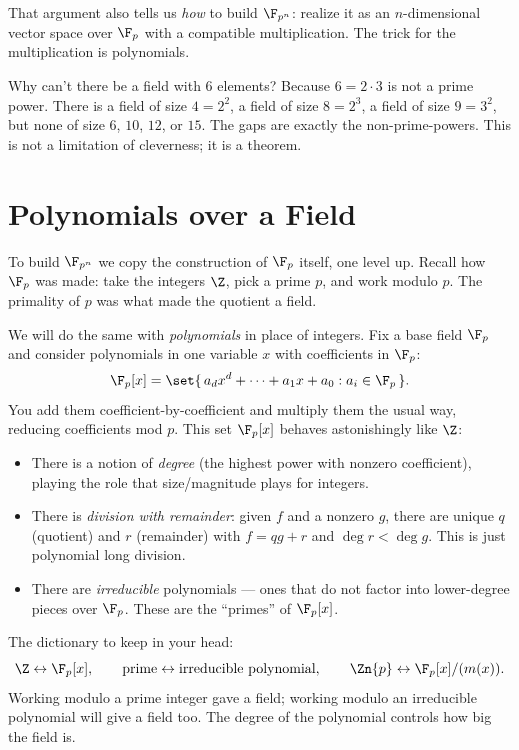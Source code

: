 That argument also tells us \emph{how} to build $\F_{p^n}$: realize it as an
$n$-dimensional vector space over $\F_p$ with a compatible multiplication.
The trick for the multiplication is polynomials.

\begin{intuitionbox}
Why can't there be a field with $6$ elements? Because $6 = 2\cdot 3$ is not a
prime power. There is a field of size $4=2^2$, a field of size $8=2^3$, a
field of size $9 = 3^2$, but none of size $6$, $10$, $12$, or $15$. The gaps
are exactly the non-prime-powers. This is not a limitation of cleverness; it
is a theorem.
\end{intuitionbox}

\section{Polynomials over a Field}
\label{ch06:polynomials}

To build $\F_{p^n}$ we copy the construction of $\F_p$ itself, one level up.
Recall how $\F_p$ was made: take the integers $\Z$, pick a prime $p$, and
work modulo $p$. The primality of $p$ was what made the quotient a field.

We will do the same with \emph{polynomials} in place of integers. Fix a base
field $\F_p$ and consider polynomials in one variable $x$ with coefficients
in $\F_p$:
\[
\F_p[x] = \set{\, a_{d}x^{d} + \dots + a_1 x + a_0 : a_i \in \F_p \,}.
\]
You add them coefficient-by-coefficient and multiply them the usual way,
reducing coefficients mod $p$. This set $\F_p[x]$ behaves astonishingly like
$\Z$:

\begin{itemize}
  \item There is a notion of \emph{degree} (the highest power with nonzero
        coefficient), playing the role that size/magnitude plays for
        integers.
  \item There is \emph{division with remainder}: given $f$ and a nonzero
        $g$, there are unique $q$ (quotient) and $r$ (remainder) with $f =
        qg + r$ and $\deg r < \deg g$. This is just polynomial long division.
  \item There are \emph{irreducible} polynomials --- ones that do not factor
        into lower-degree pieces over $\F_p$. These are the ``primes'' of
        $\F_p[x]$.
\end{itemize}

\begin{intuitionbox}
The dictionary to keep in your head:
\[
\Z \leftrightarrow \F_p[x], \qquad
\text{prime} \leftrightarrow \text{irreducible polynomial}, \qquad
\Zn{p} \leftrightarrow \F_p[x]/(m(x)).
\]
Working modulo a prime integer gave a field; working modulo an irreducible
polynomial will give a field too. The degree of the polynomial controls how
big the field is.
\end{intuitionbox}

